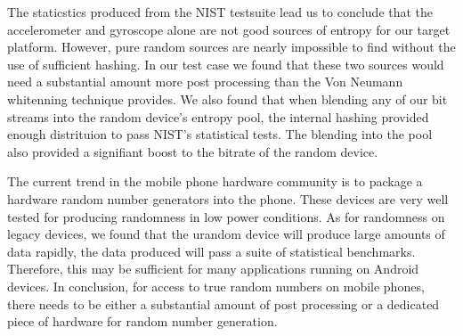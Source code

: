 
    The staticstics produced from the NIST testsuite lead us to conclude that the accelerometer 
and gyroscope alone are not good sources of entropy for our target platform. However, pure random sources are nearly
impossible to find without the use of sufficient hashing. In our test case we found that these two 
 sources would need a substantial amount more post processing than the Von Neumann 
whitenning technique provides. We also found that when blending any of our bit streams into 
the random device's entropy pool, the internal hashing provided enough distrituion to pass NIST's statistical
tests. The blending into the pool also provided a signifiant boost to the bitrate of the random device.

    The current trend in the mobile phone hardware community is to package a hardware random
number generators into the phone. These devices are very well tested for producing randomness in low power
conditions. As for randomness on legacy devices, we found that the urandom device will produce large 
amounts of data rapidly, the data produced will pass a suite of statistical benchmarks. Therefore, this may be sufficient for
many applications running on Android devices. In conclusion, for access to true random numbers on mobile phones, there
needs to be either a substantial amount of post processing or a dedicated piece of hardware for random number generation.

